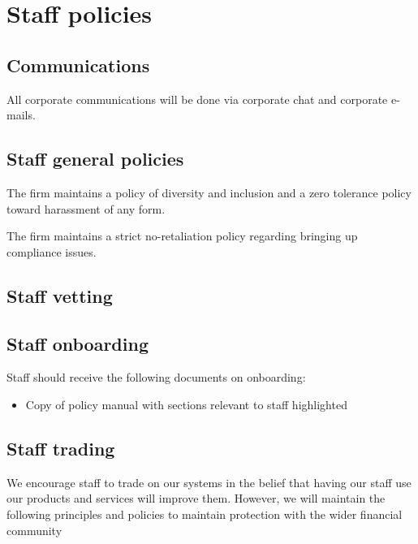 \section{Staff policies}

\subsection{Communications}
All corporate communications will be done via corporate chat and
corporate e-mails.

\subsection{Staff general policies}

The firm maintains a policy of diversity and inclusion and a zero
tolerance policy toward harassment of any form.

The firm maintains a strict no-retaliation policy regarding bringing up
compliance issues.

\subsection{Staff vetting}

\subsection{Staff onboarding}

Staff should receive the following documents on onboarding:

\begin{itemize}
  \item Copy of policy manual with sections relevant to staff
    highlighted
\end{itemize}

\subsection{Staff trading}

We encourage staff to trade on our systems in the belief that having
our staff use our products and services will improve them.
However, we will maintain the following principles and policies to
maintain protection with the wider financial community

